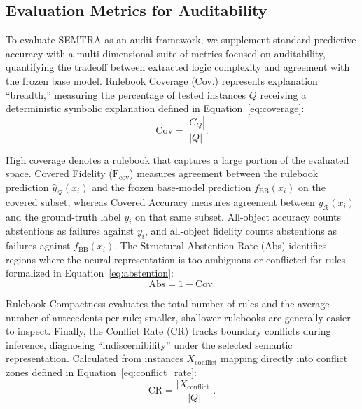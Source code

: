 \documentclass[make,article,submit,pdftex,moreauthors]{Definitions/mdpi}
\newcommand{\Rule}{\mathcal{R}}
\begin{document}
\subsection{Evaluation Metrics for Auditability}
\label{subsec:eval_metrics}

To evaluate SEMTRA as an audit framework, we supplement standard predictive accuracy with a multi-dimensional suite of metrics focused on auditability, quantifying the tradeoff between extracted logic complexity and agreement with the frozen base model. Rulebook Coverage (Cov.) represents explanation ``breadth,'' measuring the percentage of tested instances $Q$ receiving a deterministic symbolic explanation defined in Equation~\eqref{eq:coverage}:
\begin{equation}
 \label{eq:coverage}
 \mathrm{Cov} = \frac{|C_Q|}{|Q|}.
\end{equation}

High coverage denotes a rulebook that captures a large portion of the evaluated space. Covered Fidelity ($\mathrm{F}_{\text{cov}}$) measures agreement between the rulebook prediction $\hat{y}_{\Rule}(x_i)$ and the frozen base-model prediction $f_{\mathrm{BB}}(x_i)$ on the covered subset, whereas Covered Accuracy measures agreement between $\hat{y}_{\Rule}(x_i)$ and the ground-truth label $y_i$ on that same subset. All-object accuracy counts abstentions as failures against $y_i$, and all-object fidelity counts abstentions as failures against $f_{\mathrm{BB}}(x_i)$. The Structural Abstention Rate (Abs) identifies regions where the neural representation is too ambiguous or conflicted for rules formalized in Equation~\eqref{eq:abstention}:
\begin{equation}
 \label{eq:abstention}
 \mathrm{Abs} = 1 - \mathrm{Cov}.
\end{equation}

Rulebook Compactness evaluates the total number of rules and the average number of antecedents per rule; smaller, shallower rulebooks are generally easier to inspect. Finally, the Conflict Rate (CR) tracks boundary conflicts during inference, diagnosing ``indiscernibility'' under the selected semantic representation. Calculated from instances $X_{\mathrm{conflict}}$ mapping directly into conflict zones defined in Equation~\eqref{eq:conflict_rate}:
\begin{equation}
 \label{eq:conflict_rate}
 \mathrm{CR} = \frac{|X_{\mathrm{conflict}}|}{|Q|}.
\end{equation}
\end{document}
